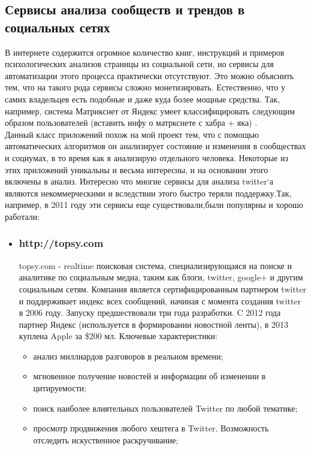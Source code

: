 \begin{itemize}
\subsection{Сервисы анализа сообществ и трендов в социальных сетях}
В интернете содержится огромное количество книг, инструкций и примеров психологических анализов страницы из социальной сети, но сервисы для автоматизации этого процесса практически отсутствуют. Это можно объяснить тем, что на такого рода сервисы сложно монетизировать. Естественно, что у самих владельцев есть подобные и даже куда более мощные средства. Так, например, система Матрикснет от Яндекс умеет классифицировать следующим образом пользователей (вставить инфу о матркснете с хабра + яка) .\\ %

Данный класс приложений похож на мой проект тем, что с помощью автоматических алгоритмов  он анализирует состояние и изменения в сообществах и социумах, в то время как я анализирую отдельного человека. Некоторые из этих приложений уникальны и весьма интересны, и на основании этого включены в анализ. Интересно что многие сервисы для анализа twitter`а являются некоммерческими и вследствии этого быстро теряли поддержку.Так, например, в 2011 году эти сервисы еще существовали,были популярны и хорошо работали:
\begin{itemize}
\item \subsubsection{http://topsy.com}
topsy.com - realtime поисковая система, специализирующаяся на поиске и аналитике по социальным медиа, таким как блоги, twitter, google+ и другим социальным сетям. Компания является сертифицированным партнером twitter и поддерживает индекс всех сообщений, начиная с момента создания twitter в 2006 году. Запуску предшествовали три года разработки. C 2012 года партнер Яндекс (используется в формировании новостной ленты), в 2013 куплена Apple за  \$200 мл. Ключевые характеристики:
\begin{itemize}
\item анализ миллиардов разговоров в реальном времени;
\item мгновенное получение новостей и информации об изменении в цитируемости;
\item поиск наиболее влиятельных пользователей Twitter по любой тематике;
\item просмотр продвижения любого хештега в Twitter. Возможность отследить искуственное раскручивание;

\end{itemize}
\end{itemize}
\end{itemize}
